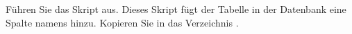 \item Führen Sie das Skript  aus. Dieses
Skript fügt der Tabelle  in der Datenbank
 eine Spalte namens  hinzu. Kopieren Sie
in das Verzeichnis .
